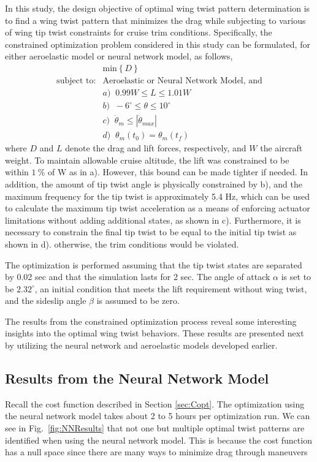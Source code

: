 \documentclass[11pt]{ucthesis}
\begin{document}
In this study, the design objective of optimal wing twist pattern determination is to find a wing twist pattern that minimizes the drag while subjecting to various of wing tip twist constraints for cruise trim conditions. Specifically, the constrained optimization problem considered in this study can be formulated, for either aeroelastic model or neural network model, as follows,
\begin{equation}    \label{eqn:COpt}
\begin{array}{rll}
& \mbox{min}\left \{ D \right \} \;\; \\
\mbox{subject to:} & \mbox{Aeroelastic or Neural Network Model, and}\\
& a) \;\; 0.99W \le L \le 1.01W \\
& b) \;\; -6^\circ \le \theta \le 10^\circ \\
& c) \;\; \ddot{\theta}_m \le|\ddot{\theta}_{max}|\\
& d) \;\; \theta_m (t_0) = \theta_m (t_{f})
\end{array}
\end{equation}
where $D$ and $L$ denote the drag and lift forces, respectively, and $W$ the aircraft weight. To maintain allowable cruise altitude, the lift was constrained to be within $1~\%$ of W as in a). However, this bound can be made tighter if needed. In addition, the amount of tip twist angle is physically constrained by b), and the maximum frequency for the tip twist is approximately 5.4 Hz, which can be used to calculate the maximum tip twist acceleration as a means of enforcing actuator limitations without adding additional states, as shown in c). Furthermore, it is necessary to constrain the final tip twist to be equal to the initial tip twist as shown in d). otherwise, the trim conditions would be violated.    

The optimization is performed assuming that the tip twist states are separated by 0.02 sec and that the simulation lasts for 2 sec. The angle of attack $\alpha$ is set to be $2.32^{\circ}$, an initial condition that meets the lift requirement without wing twist, and the sideslip angle $\beta$ is assumed to be zero. 

The results from the constrained optimization process reveal some interesting insights into the optimal wing twist behaviors. These results are presented next by utilizing the neural network and aeroelastic models developed earlier.

\subsection{Results from the Neural Network Model}
\label{sec:NNresults}
Recall the cost function described in Section \ref{sec:Copt}. The optimization using the neural network model takes about 2 to 5 hours per optimization run. We can see in Fig.~\ref{fig:NNResults} that not one but multiple optimal twist patterns are identified when using the neural network model. This is because the cost function has a null space since there are many ways to minimize drag through maneuvers
\end{document}
